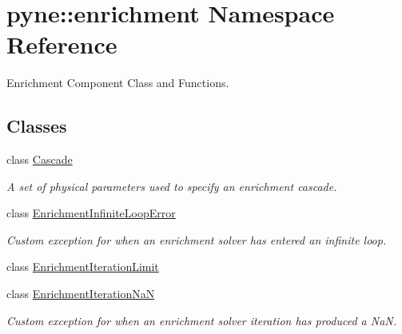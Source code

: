 \hypertarget{namespacepyne_1_1enrichment}{}\section{pyne\+:\+:enrichment Namespace Reference}
\label{namespacepyne_1_1enrichment}


Enrichment Component Class and Functions.  


\subsection*{Classes}
\begin{DoxyCompactItemize}
\item 
class \hyperlink{classpyne_1_1enrichment_1_1_cascade}{Cascade}
\begin{DoxyCompactList}\small\item\em A set of physical parameters used to specify an enrichment cascade. \end{DoxyCompactList}\item 
class \hyperlink{classpyne_1_1enrichment_1_1_enrichment_infinite_loop_error}{Enrichment\+Infinite\+Loop\+Error}
\begin{DoxyCompactList}\small\item\em Custom exception for when an enrichment solver has entered an infinite loop. \end{DoxyCompactList}\item 
class \hyperlink{classpyne_1_1enrichment_1_1_enrichment_iteration_limit}{Enrichment\+Iteration\+Limit}
\item 
class \hyperlink{classpyne_1_1enrichment_1_1_enrichment_iteration_na_n}{Enrichment\+Iteration\+NaN}
\begin{DoxyCompactList}\small\item\em Custom exception for when an enrichment solver iteration has produced a NaN. \end{DoxyCompactList}\end{DoxyCompactItemize}
